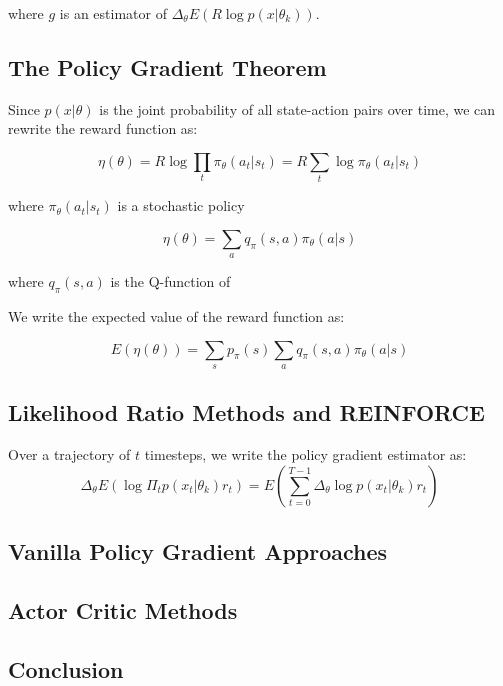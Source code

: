 \documentclass[11pt]{article}
\theoremstyle{plain}
\theoremstyle{definition}
\begin{document}
where $g$ is an estimator of $\Delta_\theta E(R \log p(x|\theta_k))$.

\subsection{The Policy Gradient Theorem}

Since $p(x|\theta)$ is the joint probability of all state-action pairs over time, we can rewrite the reward function as:

\begin{equation}
  \eta(\theta) = R \log \prod_t \pi_{\theta}(a_t|s_t) = R \sum_t \log \pi_{\theta}(a_t|s_t)
\end{equation}

where $\pi_\theta(a_t|s_t)$ is a stochastic policy

\begin{equation}
  \eta(\theta) = \sum_a q_{\pi}(s,a) \pi_{\theta}(a|s)
\end{equation}

where $q_{\pi}(s,a)$ is the Q-function of 

We write the expected value of the reward function as:

\begin{equation}
  E(\eta(\theta)) = \sum_s p_{\pi}(s) \sum_a q_{\pi}(s,a) \pi_{\theta}(a|s)
\end{equation}

\subsection{Likelihood Ratio Methods and REINFORCE}

Over a trajectory of $t$ timesteps, we write the policy gradient estimator as:
\begin{equation}
  \Delta_\theta E( \log \Pi_t p(x_t|\theta_k) r_t) = E(\sum_{t=0}^{T-1} \Delta_\theta \log p(x_t|\theta_k) r_t)
\end{equation}



\subsection{Vanilla Policy Gradient Approaches}

\subsection{Actor Critic Methods}

\subsection{Conclusion}
\end{document}

